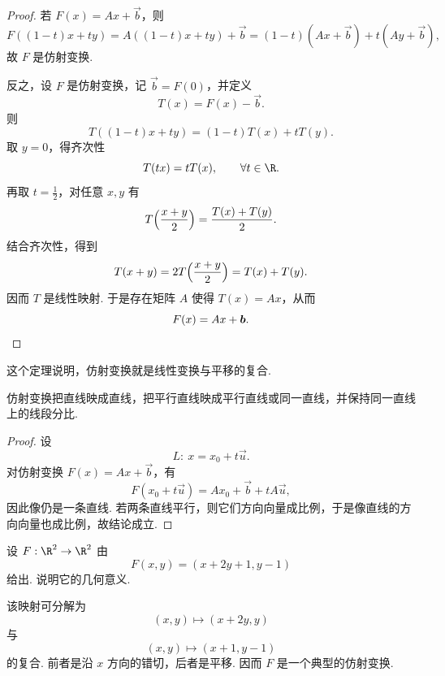 \begin{proof}
    若 $F(x) = A x + \vec{b}$，则
    \[
        F((1 - t)x + t y)
        = A((1 - t)x + t y) + \vec{b}
        = (1 - t)(A x + \vec{b}) + t(A y + \vec{b}),
    \]
    故 $F$ 是仿射变换.

    反之，设 $F$ 是仿射变换，记 $\vec{b} = F(0)$，并定义
    \[
        T(x) = F(x) - \vec{b}.
    \]
    则
    \[
        T((1 - t)x + t y) = (1 - t)T(x) + t T(y).
    \]
    取 $y = 0$，得齐次性
    \[
        T(t x) = t T(x), \qquad \forall t \in \R.
    \]
    再取 $t = \frac{1}{2}$，对任意 $x, y$ 有
    \[
        T\Bigl(\frac{x + y}{2}\Bigr) = \frac{T(x) + T(y)}{2}.
    \]
    结合齐次性，得到
    \[
        T(x + y) = 2 T\Bigl(\frac{x + y}{2}\Bigr) = T(x) + T(y).
    \]
    因而 $T$ 是线性映射. 于是存在矩阵 $A$ 使得 $T(x) = A x$，从而
    \[
        F(x) = A x + \vec{b}. \qedhere
    \]
\end{proof}

这个定理说明，仿射变换就是线性变换与平移的复合.

\begin{corollary}{}{}
    仿射变换把直线映成直线，把平行直线映成平行直线或同一直线，并保持同一直线上的线段分比.
\end{corollary}

\begin{proof}
    设
    \[
        L:\ x = x_0 + t \vec{u}.
    \]
    对仿射变换 $F(x) = A x + \vec{b}$，有
    \[
        F(x_0 + t \vec{u}) = A x_0 + \vec{b} + t A \vec{u},
    \]
    因此像仍是一条直线. 若两条直线平行，则它们方向向量成比例，于是像直线的方向向量也成比例，故结论成立.
\end{proof}

\begin{example}{}{}
    设 $F:\R^2 \to \R^2$ 由
    \[
        F(x, y) = (x + 2y + 1, y - 1)
    \]
    给出. 说明它的几何意义.
\end{example}

\begin{solution}
    该映射可分解为
    \[
        (x, y) \mapsto (x + 2y, y)
    \]
    与
    \[
        (x, y) \mapsto (x + 1, y - 1)
    \]
    的复合. 前者是沿 $x$ 方向的错切，后者是平移. 因而 $F$ 是一个典型的仿射变换.
\end{solution}

